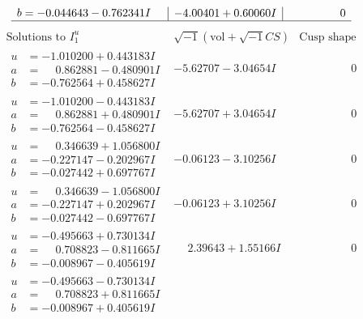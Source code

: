 \documentclass[1p]{elsarticle_modified}
\theoremstyle{definition}
\newcommand{\I}{\sqrt{-1}}
\begin{document}
$$\begin{array}{c|c|c}
\begin{aligned}
b &= -0.044643 - 0.762341 I\end{aligned}
 & -4.00401 + 0.60060 I & \phantom{-0.000000 } 0\\
 \hline 
 \end{array}$$\newpage$$\begin{array}{c|c|c}  
\text{Solutions to }I^u_{1}& \I (\text{vol} + \sqrt{-1}CS) & \text{Cusp shape}\\
 \hline 
\begin{aligned}
u &= -1.010200 + 0.443183 I \\
a &= \phantom{-}0.862881 - 0.480901 I \\
b &= -0.762564 + 0.458627 I\end{aligned}
 & -5.62707 - 3.04654 I & \phantom{-0.000000 } 0 \\ \hline\begin{aligned}
u &= -1.010200 - 0.443183 I \\
a &= \phantom{-}0.862881 + 0.480901 I \\
b &= -0.762564 - 0.458627 I\end{aligned}
 & -5.62707 + 3.04654 I & \phantom{-0.000000 } 0 \\ \hline\begin{aligned}
u &= \phantom{-}0.346639 + 1.056800 I \\
a &= -0.227147 - 0.202967 I \\
b &= -0.027442 + 0.697767 I\end{aligned}
 & -0.06123 - 3.10256 I & \phantom{-0.000000 } 0 \\ \hline\begin{aligned}
u &= \phantom{-}0.346639 - 1.056800 I \\
a &= -0.227147 + 0.202967 I \\
b &= -0.027442 - 0.697767 I\end{aligned}
 & -0.06123 + 3.10256 I & \phantom{-0.000000 } 0 \\ \hline\begin{aligned}
u &= -0.495663 + 0.730134 I \\
a &= \phantom{-}0.708823 - 0.811665 I \\
b &= -0.008967 - 0.405619 I\end{aligned}
 & \phantom{-}2.39643 + 1.55166 I & \phantom{-0.000000 } 0 \\ \hline\begin{aligned}
u &= -0.495663 - 0.730134 I \\
a &= \phantom{-}0.708823 + 0.811665 I \\
b &= -0.008967 + 0.405619 I\end{aligned}

\end{array}$$
\end{document}
